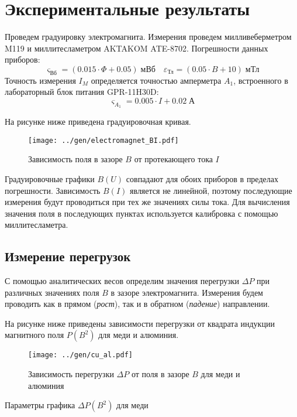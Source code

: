 \section*{Экспериментальные результаты}

Проведем градуировку электромагнита. Измерения проведем милливеберметром M119 и миллитесламетром AKTAKOM ATE-8702. Погрешности данных приборов:
$$ \varsigma_{\text{Вб}} = (0.015 \cdot \Phi + 0.05) \; \text{мВб} \quad \varepsilon_{\text{Тл}} = (0.05 \cdot B + 10) \; \text{мТл}$$
Точность измерения $I_M$ определяется точностью амперметра $A_1$, встроенного в лабораторный блок питания GPR-11H30D: $$\varsigma_{A_1} = 0.005 \cdot I + 0.02 \; \text{А}$$

На рисунке ниже приведена градуировочная кривая.

\begin{figure}[H]
	\texttt{[image: ../gen/electromagnet\_BI.pdf]}
	\caption{Зависимость поля в зазоре $B$ от протекающего тока $I$}
\end{figure}

Градуировочные графики $B(U)$ совпадают для обоих приборов в пределах погрешности. Зависимость $B(I)$ является не линейной, поэтому последующие измерения будут проводиться при тех же значениях силы тока. Для вычисления значения поля в последующих пунктах используется калибровка с помощью миллитесламетра.

\subsection*{Измерение перегрузок}

С помощью аналитических весов определим значения перегрузки $\Delta P$ при различных значениях поля $B$ в зазоре электромагнита. Измерения будем проводить как в прямом (\textit{рост}), так и в обратном (\textit{падение}) направлении.

На рисунке ниже приведены зависимости перегрузки от квадрата индукции магнитного поля $P(B^2)$ для меди и алюминия.

\begin{figure}[H]
	\texttt{[image: ../gen/cu\_al.pdf]}
	\caption{Зависимость перегрузки $\Delta P$ от поля в зазоре $B$ для меди и алюминия}
\end{figure}

\begin{table}[h]
	\caption{Параметры графика $\Delta P(B^2)$ для меди}
	
\end{table}

